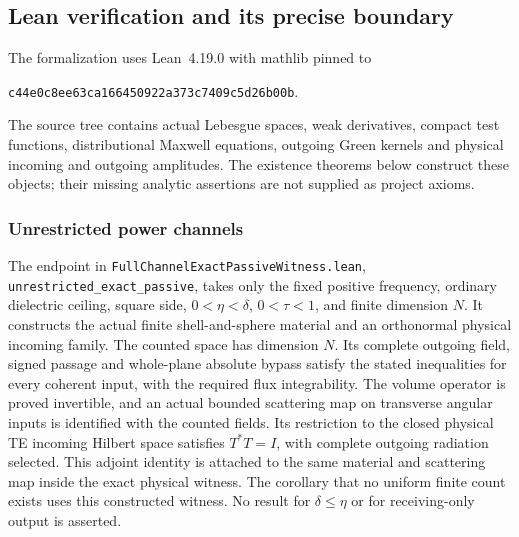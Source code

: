 \subsection{Lean verification and its precise boundary}
\label{ver:lean}
The formalization uses Lean~4.19.0 with mathlib pinned to
\begin{center}\small\texttt{c44e0c8ee63ca166450922a373c7409c5d26b00b}.\end{center}
The source tree contains actual Lebesgue spaces, weak derivatives,
compact test functions, distributional Maxwell equations, outgoing
Green kernels and physical incoming and outgoing amplitudes.  The
existence theorems below construct these objects; their missing
analytic assertions are not supplied as project axioms.

\subsubsection*{Unrestricted power channels}
The endpoint in \texttt{FullChannelExactPassiveWitness.lean},
\texttt{unrestricted\_exact\_passive}, takes only the fixed
positive frequency, ordinary dielectric ceiling, square side,
$0<\eta<\delta$, $0<\tau<1$, and finite dimension $N$.
It constructs the actual finite shell-and-sphere material and an
orthonormal physical incoming family.  The counted space has dimension
$N$.  Its complete outgoing field, signed passage and whole-plane
absolute bypass satisfy the stated inequalities for every coherent
input, with the required flux integrability.  The volume operator is
proved invertible, and an actual bounded scattering map on transverse
angular inputs is identified with the counted fields. Its restriction
to the closed physical TE incoming Hilbert space satisfies $T^*T=I$,
with complete outgoing radiation selected. This adjoint identity is
attached to the same material and scattering map inside the exact
physical witness. The corollary that no uniform finite count
exists uses this constructed witness.  No result for $\delta\leq\eta$
or for receiving-only output is asserted.

